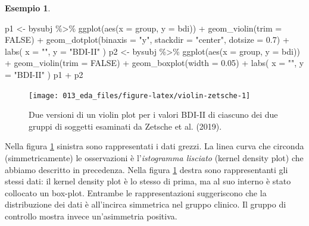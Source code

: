 \documentclass[
  10pt,
  italian,
  a4paper,
  extrafontsizes,onecolumn,openright
  ]{memoir}
\newenvironment{Shaded}{\begin{snugshade}}{\end{snugshade}}
\newcommand{\AttributeTok}[1]{\textcolor[rgb]{0.77,0.63,0.00}{#1}}
\newcommand{\ConstantTok}[1]{\textcolor[rgb]{0.00,0.00,0.00}{#1}}
\newcommand{\FloatTok}[1]{\textcolor[rgb]{0.00,0.00,0.81}{#1}}
\newcommand{\FunctionTok}[1]{\textcolor[rgb]{0.00,0.00,0.00}{#1}}
\newcommand{\NormalTok}[1]{#1}
\newcommand{\OtherTok}[1]{\textcolor[rgb]{0.56,0.35,0.01}{#1}}
\newcommand{\SpecialCharTok}[1]{\textcolor[rgb]{0.00,0.00,0.00}{#1}}
\newcommand{\StringTok}[1]{\textcolor[rgb]{0.31,0.60,0.02}{#1}}
\theoremstyle{definition}
\theoremstyle{definition}
\newtheorem{example}{Esempio}[chapter]
\theoremstyle{definition}
\theoremstyle{definition}
\theoremstyle{remark}
\begin{document}
\begin{example}
\begin{Shaded}
\begin{Highlighting}[]
\NormalTok{p1 }\OtherTok{\textless{}{-}}\NormalTok{ bysubj }\SpecialCharTok{\%\textgreater{}\%}
  \FunctionTok{ggplot}\NormalTok{(}\FunctionTok{aes}\NormalTok{(}\AttributeTok{x =}\NormalTok{ group, }\AttributeTok{y =}\NormalTok{ bdi)) }\SpecialCharTok{+}
  \FunctionTok{geom\_violin}\NormalTok{(}\AttributeTok{trim =} \ConstantTok{FALSE}\NormalTok{) }\SpecialCharTok{+}
  \FunctionTok{geom\_dotplot}\NormalTok{(}\AttributeTok{binaxis =} \StringTok{"y"}\NormalTok{, }\AttributeTok{stackdir =} \StringTok{"center"}\NormalTok{, }\AttributeTok{dotsize =} \FloatTok{0.7}\NormalTok{) }\SpecialCharTok{+}
  \FunctionTok{labs}\NormalTok{(}
    \AttributeTok{x =} \StringTok{""}\NormalTok{,}
    \AttributeTok{y =} \StringTok{"BDI{-}II"}
\NormalTok{  )}
\NormalTok{p2 }\OtherTok{\textless{}{-}}\NormalTok{ bysubj }\SpecialCharTok{\%\textgreater{}\%}
  \FunctionTok{ggplot}\NormalTok{(}\FunctionTok{aes}\NormalTok{(}\AttributeTok{x =}\NormalTok{ group, }\AttributeTok{y =}\NormalTok{ bdi)) }\SpecialCharTok{+}
  \FunctionTok{geom\_violin}\NormalTok{(}\AttributeTok{trim =} \ConstantTok{FALSE}\NormalTok{) }\SpecialCharTok{+}
  \FunctionTok{geom\_boxplot}\NormalTok{(}\AttributeTok{width =} \FloatTok{0.05}\NormalTok{) }\SpecialCharTok{+}
  \FunctionTok{labs}\NormalTok{(}
    \AttributeTok{x =} \StringTok{""}\NormalTok{,}
    \AttributeTok{y =} \StringTok{"BDI{-}II"}
\NormalTok{  )}
\NormalTok{p1 }\SpecialCharTok{+}\NormalTok{ p2}
\end{Highlighting}
\end{Shaded}

\begin{figure}[h]

{\centering \texttt{[image: 013\_eda\_files/figure-latex/violin-zetsche-1]} 

}

\caption{Due versioni di un violin plot per i valori BDI-II di ciascuno dei due gruppi di soggetti esaminati da Zetsche et al. (2019).}\label{fig:violin-zetsche}
\end{figure}

Nella figura \ref{fig:violin-zetsche} sinistra sono rappresentati i dati grezzi. La linea curva che circonda (simmetricamente) le osservazioni è l'\emph{istogramma lisciato} (kernel density plot) che abbiamo descritto in precedenza. Nella figura \ref{fig:violin-zetsche} destra sono rappresentanti gli stessi dati: il kernel density plot è lo stesso di prima, ma al suo interno è stato collocato un box-plot. Entrambe le rappresentazioni suggeriscono che la distribuzione dei dati è all'incirca simmetrica nel gruppo clinico. Il gruppo di controllo mostra invece un'asimmetria positiva.
\end{example}
\end{document}
